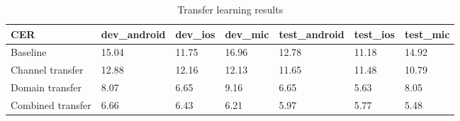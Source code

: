 \documentclass[a4paper]{article}
\begin{document}
\begin{table}[th]
  \caption{Transfer learning results}
  \label{tab:trans}
  \centering
  \begin{tabular}{ lllllll }
    \toprule
    CER               &  dev\_android           &  dev\_ios           &  dev\_mic           &  test\_android           &  test\_ios           &  test\_mic     \\
    \midrule
    Baseline          &  15.04                 &  11.75             &  16.96             &  12.78                  &  11.18              &  14.92        \\
    Channel transfer  &  12.88                 &  12.16             &  12.13             &  11.65                  &  11.48              &  10.79        \\
    Domain transfer   &  8.07                  &  6.65              &  9.16              &  6.65                   &  5.63               &  8.05         \\
    Combined transfer &  6.66                  &  6.43              &  6.21              &  5.97                   &  5.77               &  5.48         \\
    \bottomrule
  \end{tabular}
\end{table}
\end{document}
